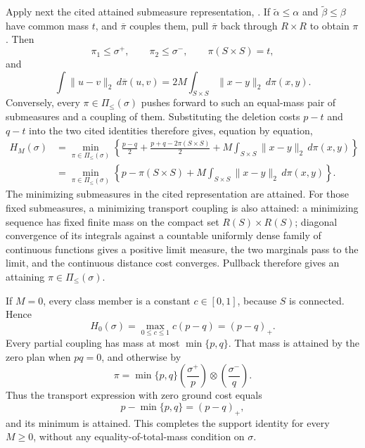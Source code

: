 Apply next the cited attained submeasure representation, \cite[Definition 3 and Proposition 4]{PiccoliRossi2016GeneralizedWasserstein}.  If \(\widetilde\alpha\leq\alpha\) and \(\widetilde\beta\leq\beta\) have common mass \(t\), and \(\overline\pi\) couples them, pull \(\overline\pi\) back through \(R\times R\) to obtain \(\pi\).  Then
\[
 \pi_1\leq\sigma^+,
 \qquad
 \pi_2\leq\sigma^-,
 \qquad
 \pi(S\times S)=t,
\]
and
\[
 \int\lVert u-v\rVert_2\,d\overline\pi(u,v)
 =2M\int_{S\times S}\lVert x-y\rVert_2\,d\pi(x,y).
\]
Conversely, every \(\pi\in\Pi_{\leq}(\sigma)\) pushes forward to such an equal-mass pair of submeasures and a coupling of them.  Substituting the deletion costs \(p-t\) and \(q-t\) into the two cited identities therefore gives, equation by equation,
\[
\begin{aligned}
 H_M(\sigma)
 &=\min_{\pi\in\Pi_{\leq}(\sigma)}
   \left\{
      \frac{p-q}{2}+\frac{p+q-2\pi(S\times S)}{2}
      +M\int_{S\times S}\lVert x-y\rVert_2\,d\pi(x,y)
   \right\}\\
 &=\min_{\pi\in\Pi_{\leq}(\sigma)}
   \left\{
      p-\pi(S\times S)
      +M\int_{S\times S}\lVert x-y\rVert_2\,d\pi(x,y)
   \right\}.
\end{aligned}
\]
The minimizing submeasures in the cited representation are attained.  For those fixed submeasures, a minimizing transport coupling is also attained: a minimizing sequence has fixed finite mass on the compact set \(R(S)\times R(S)\); diagonal convergence of its integrals against a countable uniformly dense family of continuous functions gives a positive limit measure, the two marginals pass to the limit, and the continuous distance cost converges.  Pullback therefore gives an attaining \(\pi\in\Pi_{\leq}(\sigma)\).

If \(M=0\), every class member is a constant \(c\in[0,1]\), because \(S\) is connected.  Hence
\[
 H_0(\sigma)=\max_{0\leq c\leq1}c(p-q)=(p-q)_+.
\]
Every partial coupling has mass at most \(\min\{p,q\}\).  That mass is attained by the zero plan when \(pq=0\), and otherwise by
\[
 \pi=\min\{p,q\}\left(\frac{\sigma^+}{p}\right)
                    \otimes\left(\frac{\sigma^-}{q}\right).
\]
Thus the transport expression with zero ground cost equals
\[
 p-\min\{p,q\}=(p-q)_+,
\]
and its minimum is attained.  This completes the support identity for every \(M\geq0\), without any equality-of-total-mass condition on \(\sigma\).

